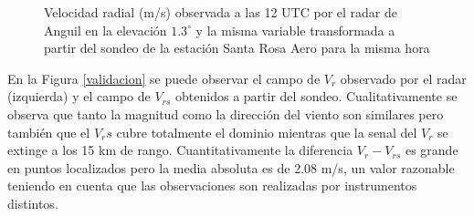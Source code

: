 \documentclass[12pt,spanish,oneside]{book}
\begin{document}
\begin{figure}
\newline{}\caption{Velocidad radial (m/s) observada a las 12 UTC por el radar de Anguil en la elevación $1.3^{\circ}$ y la misma variable transformada a partir del sondeo de la estación Santa Rosa Aero para la misma hora \label{validacion}}\label{fig:validacion}
\end{figure}

En la Figura \ref{validacion} se puede observar el campo de \(V_r\)
observado por el radar (izquierda) y el campo de \(V_{rs}\) obtenidos a
partir del sondeo. Cualitativamente se observa que tanto la magnitud
como la dirección del viento son similares pero también que el \(V_rs\)
cubre totalmente el dominio mientras que la senal del \(V_r\) se extinge
a los 15 km de rango. Cuantitativamente la diferencia \(V_r - V_{rs}\)
es grande en puntos localizados pero la media absoluta es de 2.08 m/s,
un valor razonable teniendo en cuenta que las observaciones son
realizadas por instrumentos distintos.
\end{document}
